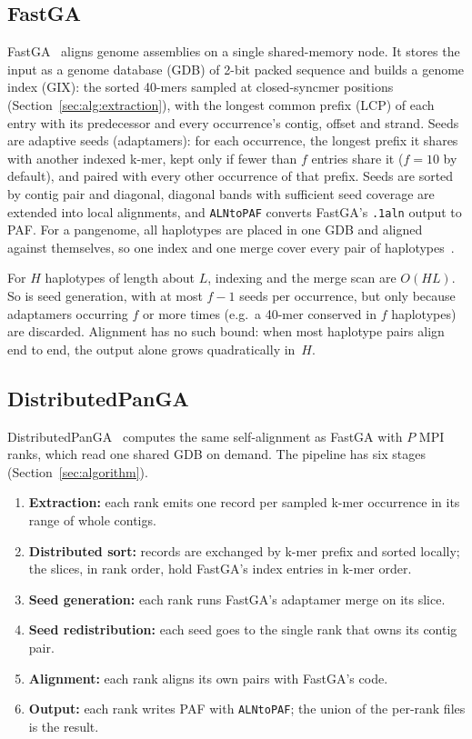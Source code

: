 \subsection{FastGA}\label{sec:methods:fastga}

FastGA~\cite{fastga} aligns genome assemblies on a single shared-memory
node. It stores the input as a genome database (GDB) of 2-bit packed
sequence and builds a genome index (GIX): the sorted 40-mers sampled at
closed-syncmer positions (Section~\ref{sec:alg:extraction}), with the
longest common prefix (LCP) of each entry with its predecessor and every
occurrence's contig, offset and strand. Seeds are adaptive seeds
(adaptamers): for each occurrence, the longest prefix it shares with
another indexed k-mer, kept only if fewer than $f$ entries share it
($f=10$ by default), and paired with every other occurrence of that prefix.
Seeds are sorted by contig pair and diagonal, diagonal bands with
sufficient seed coverage are extended into local alignments, and
\texttt{ALNtoPAF} converts FastGA's \texttt{.1aln} output to PAF.
For a pangenome, all haplotypes are placed in one GDB and aligned against
themselves, so one index and one merge cover every pair of
haplotypes~\cite{garrison}.

For $H$ haplotypes of length about $L$, indexing and the merge scan are
$O(HL)$. So is seed generation, with at most $f-1$ seeds per occurrence,
but only because adaptamers occurring $f$ or more times (e.g.\ a 40-mer
conserved in $f$ haplotypes) are discarded. Alignment has no such bound:
when most haplotype pairs align end to end, the output alone grows
quadratically in~$H$.

\subsection{DistributedPanGA}\label{sec:methods:overview}

DistributedPanGA~\cite{dpanga} computes the same self-alignment as FastGA
with $P$ MPI ranks, which read one shared GDB on demand.
The pipeline has six stages (Section~\ref{sec:algorithm}).
\begin{enumerate}
\item \textbf{Extraction:} each rank emits one record per sampled k-mer
  occurrence in its range of whole contigs.
\item \textbf{Distributed sort:} records are exchanged by k-mer prefix and
  sorted locally; the slices, in rank order, hold FastGA's index entries in
  k-mer order.
\item \textbf{Seed generation:} each rank runs FastGA's adaptamer merge on
  its slice.
\item \textbf{Seed redistribution:} each seed goes to the single rank that
  owns its contig pair.
\item \textbf{Alignment:} each rank aligns its own pairs with FastGA's code.
\item \textbf{Output:} each rank writes PAF with \texttt{ALNtoPAF}; the
  union of the per-rank files is the result.
\end{enumerate}

